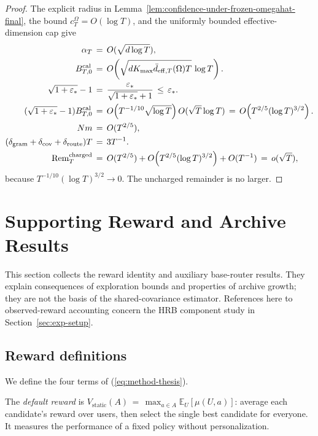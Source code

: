 \documentclass{article} %
\providecommand{\E}{\mathbb{E}}
\renewcommand{\eqref}[1]{\textup{(\ref{#1})}}
\begin{document}
\begin{proof}
The explicit radius in
Lemma~\ref{lem:confidence-under-frozen-omegahat-final}, the bound
\(c_T^\Omega=O(\log T)\), and the uniformly bounded effective-dimension cap
give
\begin{equation}
\begin{aligned}
\alpha_T
&\,=\,
O(\sqrt{d\log T}),
\\
B_{T,0}^{\rm cal}
&\,=\,
O\!\left(
\sqrt{dK_{\max}\bar d_{\mathrm{eff},T}(\Omega)T}\,\log T
\right).
\\
\sqrt{1+\varepsilon_*}-1
&\,=\,
\frac{\varepsilon_*}{\sqrt{1+\varepsilon_*}+1}
\,\leq\,
\varepsilon_*.
\\
(\sqrt{1+\varepsilon_*}-1)B_{T,0}^{\rm cal}
&\,=\,
O\!\left(T^{-1/10}\sqrt{\log T}\right)
O(\sqrt{T}\log T)
\,=\,
O\!\left(T^{2/5}(\log T)^{3/2}\right).
\\
Nm
&\,=\,
O(T^{2/5}),
\\
(\delta_{\rm gram}+\delta_{\rm cov}+\delta_{\rm route})T
&\,=\,
3T^{-1}.
\\
\operatorname{Rem}_T^{\rm charged}
&\,=\,
O(T^{2/5})
+
O\!\left(T^{2/5}(\log T)^{3/2}\right)
+
O(T^{-1})
\,=\,
o(\sqrt T),
\end{aligned}
\end{equation}
because
\(T^{-1/10}(\log T)^{3/2}\to0\). The uncharged remainder is no larger.
\end{proof}

\section{Supporting Reward and Archive Results}
\label{app:reward-support}

This section collects the reward identity and auxiliary base-router results.
They explain consequences of exploration bounds and properties of archive
growth; they are not the basis of the shared-covariance estimator.
References here to observed-reward accounting concern the HRB component
study in Section~\ref{sec:exp-setup}.

\subsection{Reward definitions}

We define the four terms of \eqref{eq:method-thesis}.

The \emph{default reward} is $V_{\mathrm{static}}(A) \,=\, \max_{a \in A} \E_{U}[\mu(U,a)]$: average each candidate's reward over users, then select the single best candidate for everyone. It measures the performance of a fixed policy without personalization.
\end{document}
